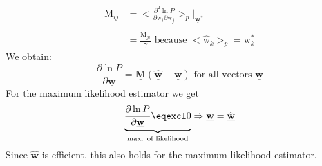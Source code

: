 \documentclass[a4paper,11pt]{article}
\begin{document}
\begin{equation}
	\begin{array}{ll}
	\mathrm{M}_{ij} 
	& = \Big< \frac{\partial^2 \ln P}{\partial \mathrm{w}_i
		\partial \mathrm{w}_j}	\Big>_p 
		\Big|_{\underline{\mathbf{w}}^*}\\\\
	& = \frac{\mathrm{M}_{ji}}{\gamma} \text{ because } 
		<\hat{\mathrm{w}}_k>_p = \mathrm{w}_k^*
	\end{array}
\end{equation}
We obtain:
\begin{equation}
	\frac{\partial \ln P}{\partial \underline{\mathbf{w}}} 
	= \underline{\mathbf{M}} (\hat{\underline{\mathbf{w}}} 
		- \underline{\mathbf{w}}) \text{ for all vectors }
		\underline{\mathbf{w}}
\end{equation}
For the maximum likelihood estimator we get
\begin{equation}
	\underbrace{ \frac{\partial \ln P}{\partial \underline{\mathbf{w}}} 
		\eqexcl 0}_{\text{max. of likelihood}}
	\Rightarrow \underline{\mathbf{w}} = \hat{\underline{\mathbf{w}}}
\end{equation}
Since $\hat{\underline{\mathbf{w}}}$ is efficient, this also holds for the maximum likelihood estimator.
\end{document}
